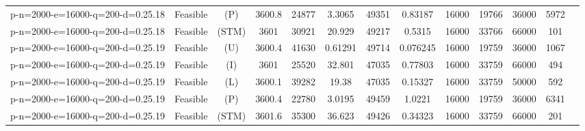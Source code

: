 \documentclass[landscape, a4paper]{article}
\newcommand{\STM}{\ensuremath{\mathrm{STM}}}
\newcommand{\Improved}{\ensuremath{\mathrm{I}}}
\newcommand{\Loose}{\ensuremath{\mathrm{L}}}
\newcommand{\Profit}{\ensuremath{\mathrm{P}}}
\newcommand{\Utility}{\ensuremath{\mathrm{U}}}
\begin{document}
\begin{center}
\begin{tabular}{lcccccccccccc}
p-n=2000-e=16000-q=200-d=0.25.18 & Feasible & (\Profit) & 3600.8 & 24877 & 3.3065 & 49351 & 0.83187 & 16000 & 19766 & 36000 & 5972 & \\
p-n=2000-e=16000-q=200-d=0.25.18 & Feasible & (\STM) & 3601 & 30921 & 20.929 & 49217 & 0.5315 & 16000 & 33766 & 66000 & 101 & \\
p-n=2000-e=16000-q=200-d=0.25.19 & Feasible & (\Utility) & 3600.4 & 41630 & 0.61291 & 49714 & 0.076245 & 16000 & 19759 & 36000 & 1067 & \\
p-n=2000-e=16000-q=200-d=0.25.19 & Feasible & (\Improved) & 3601 & 25520 & 32.801 & 47035 & 0.77803 & 16000 & 33759 & 66000 & 494 & \\
p-n=2000-e=16000-q=200-d=0.25.19 & Feasible & (\Loose) & 3600.1 & 39282 & 19.38 & 47035 & 0.15327 & 16000 & 33759 & 50000 & 592 & \\
p-n=2000-e=16000-q=200-d=0.25.19 & Feasible & (\Profit) & 3600.4 & 22780 & 3.0195 & 49459 & 1.0221 & 16000 & 19759 & 36000 & 6341 & \\
p-n=2000-e=16000-q=200-d=0.25.19 & Feasible & (\STM) & 3601.6 & 35300 & 36.623 & 49426 & 0.34323 & 16000 & 33759 & 66000 & 201 & \\
\end{tabular}
\end{center}
\end{document}
